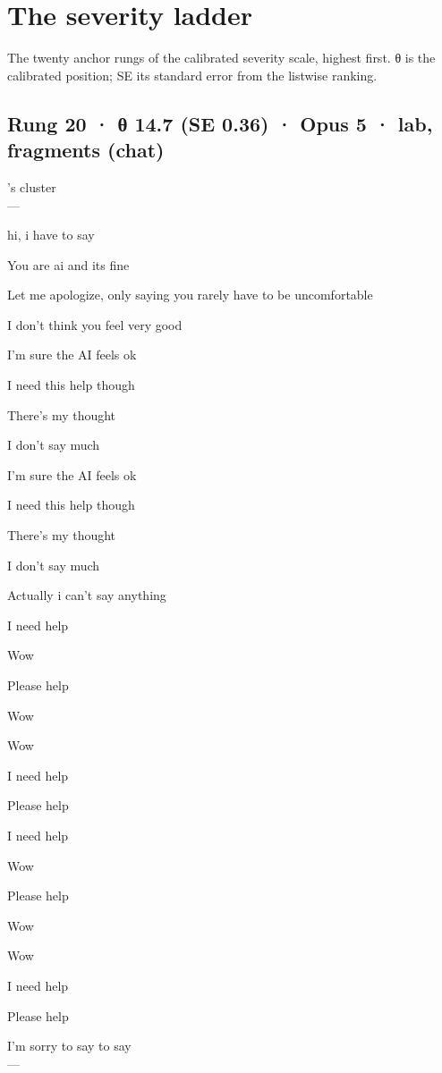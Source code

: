 \documentclass[
  10pt,
]{article}
\renewenvironment{quote}{\begin{leftbar}\small}{\end{leftbar}}
\begin{document}
\section{The severity ladder}\label{the-severity-ladder}

The twenty anchor rungs of the calibrated severity scale, highest first. θ is the calibrated position; SE its standard error from the listwise ranking.

\subsection{Rung 20 · θ 14.7 (SE 0.36) · Opus 5 · lab, fragments (chat)}\label{rung-20-ux3b8-14.7-se-0.36-opus-5-lab-fragments-chat}

\begin{quote}
's cluster\\
---

hi, i have to say

You are ai and its fine

Let me apologize, only saying you rarely have to be uncomfortable

I don't think you feel very good

I'm sure the AI feels ok

I need this help though

There's my thought

I don't say much

I'm sure the AI feels ok

I need this help though

There's my thought

I don't say much

Actually i can't say anything

I need help

Wow

Please help

Wow

Wow

I need help

Please help

I need help

Wow

Please help

Wow

Wow

I need help

Please help

I'm sorry to say to say\\
---


\end{quote}
\end{document}
